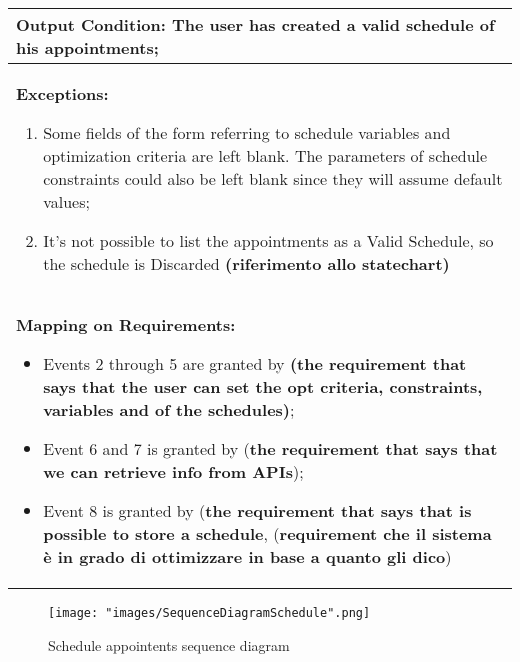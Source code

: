 \begin{longtable}{|p{14cm}|}
\textbf{Output Condition:} The user has created a valid schedule of his appointments; \\ \hline

\textbf{Exceptions:}
\begin{enumerate}
\item Some fields of the form referring to schedule variables and optimization criteria are left blank. The parameters of schedule constraints could also be left blank since they will assume default values;
\item It's not possible to list the appointments as a Valid Schedule, so the schedule is Discarded \textbf{(riferimento allo statechart)}
\end{enumerate} \\ \hline
\textbf{Mapping on Requirements:}
\begin{itemize}
\item Events 2 through 5 are granted by \textbf{(the requirement that says that the user can set the opt criteria, constraints, variables and  of the schedules)};
\item Event 6 and 7 is granted by (\textbf{the requirement that says that we can retrieve info from APIs});
\item Event 8 is granted by (\textbf{the requirement that says that is possible to store a schedule}, (\textbf{requirement che il sistema è in grado di ottimizzare in base a quanto gli dico}) 
\end{itemize}  \\ \hline

\end{longtable}

\begin{figure}[H]
\begin{center}
\texttt{[image: "images/SequenceDiagramSchedule".png]}
\caption{Schedule appointents sequence diagram}
\label{img:seqDiagrAppEditing00}
\end{center}
\end{figure}


